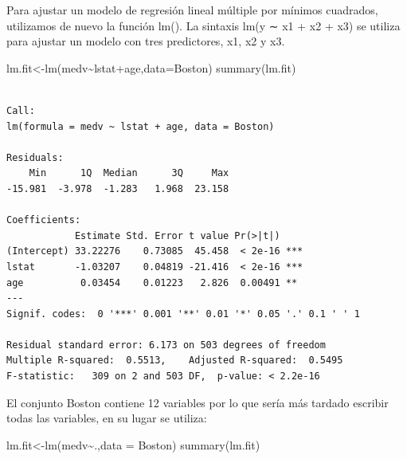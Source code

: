 \documentclass[
  letterpaper,
  DIV=11,
  numbers=noendperiod]{scrartcl}
\newenvironment{Shaded}{\begin{snugshade}}{\end{snugshade}}
\newcommand{\AttributeTok}[1]{\textcolor[rgb]{0.40,0.45,0.13}{#1}}
\newcommand{\FunctionTok}[1]{\textcolor[rgb]{0.28,0.35,0.67}{#1}}
\newcommand{\NormalTok}[1]{\textcolor[rgb]{0.00,0.23,0.31}{#1}}
\newcommand{\OtherTok}[1]{\textcolor[rgb]{0.00,0.23,0.31}{#1}}
\newcommand{\SpecialCharTok}[1]{\textcolor[rgb]{0.37,0.37,0.37}{#1}}
\begin{document}
Para ajustar un modelo de regresión lineal múltiple por mínimos
cuadrados, utilizamos de nuevo la función lm(). La sintaxis lm(y ∼ x1 +
x2 + x3) se utiliza para ajustar un modelo con tres predictores, x1, x2
y x3.

\begin{Shaded}
\begin{Highlighting}[]
\NormalTok{lm.fit}\OtherTok{\textless{}{-}}\FunctionTok{lm}\NormalTok{(medv}\SpecialCharTok{\textasciitilde{}}\NormalTok{lstat}\SpecialCharTok{+}\NormalTok{age,}\AttributeTok{data=}\NormalTok{Boston)}
\FunctionTok{summary}\NormalTok{(lm.fit)}
\end{Highlighting}
\end{Shaded}

\begin{verbatim}

Call:
lm(formula = medv ~ lstat + age, data = Boston)

Residuals:
    Min      1Q  Median      3Q     Max 
-15.981  -3.978  -1.283   1.968  23.158 

Coefficients:
            Estimate Std. Error t value Pr(>|t|)    
(Intercept) 33.22276    0.73085  45.458  < 2e-16 ***
lstat       -1.03207    0.04819 -21.416  < 2e-16 ***
age          0.03454    0.01223   2.826  0.00491 ** 
---
Signif. codes:  0 '***' 0.001 '**' 0.01 '*' 0.05 '.' 0.1 ' ' 1

Residual standard error: 6.173 on 503 degrees of freedom
Multiple R-squared:  0.5513,    Adjusted R-squared:  0.5495 
F-statistic:   309 on 2 and 503 DF,  p-value: < 2.2e-16
\end{verbatim}

El conjunto Boston contiene 12 variables por lo que sería más tardado
escribir todas las variables, en su lugar se utiliza:

\begin{Shaded}
\begin{Highlighting}[]
\NormalTok{lm.fit}\OtherTok{\textless{}{-}}\FunctionTok{lm}\NormalTok{(medv}\SpecialCharTok{\textasciitilde{}}\NormalTok{.,}\AttributeTok{data =}\NormalTok{ Boston)}
\FunctionTok{summary}\NormalTok{(lm.fit)}
\end{Highlighting}
\end{Shaded}
\end{document}
